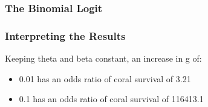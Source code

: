 \begin{frame}\frametitle{The Binomial Logit}
{\fontsize{8}{3} \color{RBlue} }
\end{frame}

\begin{frame}\frametitle{Interpreting the Results}
Keeping theta and beta constant, an increase in g of:
\begin{itemize}
\item 0.01 has an odds ratio of coral survival of 3.21\\
\item 0.1 has an odds ratio of coral survival of 116413.1
\end{itemize}
\end{frame}


